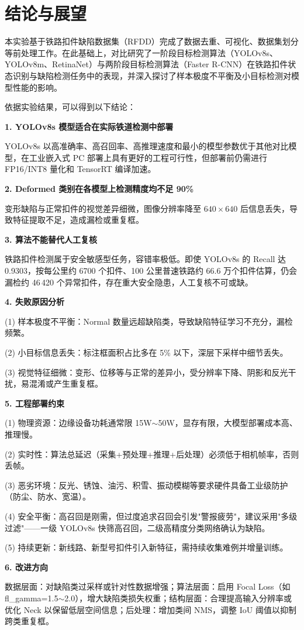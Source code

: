 \documentclass[12pt, oneside, a4paper]{ctexart}
\begin{document}
\section{结论与展望}
\par{}
本实验基于铁路扣件缺陷数据集（RFDD）完成了数据去重、可视化、数据集划分等前处理工作。在此基础上，对比研究了一阶段目标检测算法（YOLOv8s、YOLOv8m、RetinaNet）与两阶段目标检测算法（Faster R-CNN）在铁路扣件状态识别与缺陷检测任务中的表现，并深入探讨了样本极度不平衡及小目标检测对模型性能的影响。
\par{}
依据实验结果，可以得到以下结论：
\par{}
\noindent\textbf{\heiti{}1. YOLOv8s 模型适合在实际铁道检测中部署}
\par{}
YOLOv8s 以高准确率、高召回率、高推理速度和最小的模型参数优于其他对比模型，在工业嵌入式 PC 部署上具有更好的工程可行性，但部署前仍需进行 FP16/INT8 量化和 TensorRT 编译加速。
\par{}
\noindent\textbf{\heiti{}2. Deformed 类别在各模型上检测精度均不足 90\%}
\par{}
变形缺陷与正常扣件的视觉差异细微，图像分辨率降至 $640 \times 640$ 后信息丢失，导致特征提取不足，造成漏检或重复框。
\par{}
\noindent\textbf{\heiti{}3. 算法不能替代人工复核}
\par{}
铁路扣件检测属于安全敏感型任务，容错率极低。即使 YOLOv8s 的 Recall 达 0.9303，按每公里约 6700 个扣件、100 公里普速铁路约 66.6 万个扣件估算，仍会漏检约 46\,420 个异常扣件，存在重大安全隐患，人工复核不可或缺。
\par{}
\noindent\textbf{\heiti{}4. 失败原因分析}
\par{}
(1) 样本极度不平衡：Normal 数量远超缺陷类，导致缺陷特征学习不充分，漏检频繁。
\par{}
(2) 小目标信息丢失：标注框面积占比多在 5\% 以下，深层下采样中细节丢失。
\par{}
(3) 视觉特征细微：变形、位移等与正常的差异小，受分辨率下降、阴影和反光干扰，易混淆或产生重复框。
\par{}
\noindent\textbf{\heiti{}5. 工程部署约束}
\par{}
(1) 物理资源：边缘设备功耗通常限 15W$\sim$50W，显存有限，大模型部署成本高、推理慢。
\par{}
(2) 实时性：算法总延迟（采集+预处理+推理+后处理）必须低于相机帧率，否则丢帧。
\par{}
(3) 恶劣环境：反光、锈蚀、油污、积雪、振动模糊等要求硬件具备工业级防护（防尘、防水、宽温）。
\par{}
(4) 安全平衡：高召回是刚需，但过度追求召回会引发"警报疲劳"，建议采用"多级过滤"——一级 YOLOv8s 快筛高召回，二级高精度分类网络确认为缺陷。
\par{}
(5) 持续更新：新线路、新型号扣件引入新特征，需持续收集难例并增量训练。
\par{}
\noindent\textbf{\heiti{}6. 改进方向}
\par{}
数据层面：对缺陷类过采样或针对性数据增强；算法层面：启用 Focal Loss（如 fl\_gamma=1.5$\sim$2.0），增大缺陷类损失权重；结构层面：合理提高输入分辨率或优化 Neck 以保留低层空间信息；后处理：增加类间 NMS，调整 IoU 阈值以抑制跨类重复框。
\par{}
\quad{}
\par{}
\end{document}
